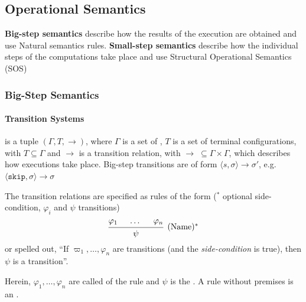 \newpage
\subsection{Operational Semantics}
\textbf{Big-step semantics} describe how the  results of the execution are obtained and use Natural semantics rules.
\textbf{Small-step semantics} describe how the individual steps of the computations take place and use Structural Operational Semantics (SOS)

\subsubsection{Big-Step Semantics}
\paragraph{Transition Systems}
 is a tuple $(\Gamma, T, \rightarrow)$, where $\Gamma$ is a set of ,
$T$ is a set of terminal configurations, with $T \subseteq \Gamma$ and $\rightarrow$ is a transition relation, with $\rightarrow \; \subseteq \Gamma \times \Gamma$,
which describes how executions take place. Big-step transitions are of form $\langle s, \sigma \rangle \rightarrow \sigma'$,
e.g. $\langle \texttt{skip}, \sigma \rangle \rightarrow \sigma$

The transition relations are specified as rules of the form ($^*$ optional side-condition, $\varphi_i$ and $\psi$ transitions)
\[
    \begin{prooftree}
        \hypo{\varphi_1}
        \hypo{\dots}
        \hypo{\varphi_n}
        \infer3[(Name)$^*$]{\psi}
    \end{prooftree}
\]
or spelled out, ``If $\varpi_1, \ldots, \varphi_n$ are transitions (and the \textit{side-condition} is true), then $\psi$ is a transition''.

Herein, $\varphi_1, \ldots, \varphi_n$ are called  of the rule and $\psi$ is the . A rule without premises is an .
